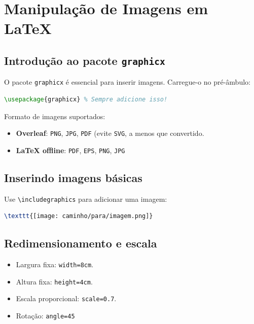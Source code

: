 \chapter{Manipulação de Imagens em LaTeX}



\section{Introdução ao pacote \texttt{graphicx}}

O pacote \verb|graphicx| é essencial para inserir imagens. Carregue-o no pré-âmbulo:

\begin{lstlisting}[language=tex, caption=Carregue o pacote \texttt{graphicx}]
    \usepackage{graphicx} % Sempre adicione isso!
\end{lstlisting}

Formato de imagens suportados:
\begin{itemize}
    \item \textbf{Overleaf}: \verb|PNG|, \verb|JPG|, \verb|PDF| (evite \verb|SVG|, a menos que convertido.
    \item \textbf{LaTeX offline}: \verb|PDF|, \verb|EPS|, \verb|PNG|, \verb|JPG|
\end{itemize}

\section{Inserindo imagens básicas}

Use \verb|\includegraphics| para adicionar uma imagem:

\begin{lstlisting}[language=tex, caption=Inserindo uma imagem]
    \texttt{[image: caminho/para/imagem.png]}  
\end{lstlisting}

\section{Redimensionamento e escala}

\begin{itemize}
    \item Largura fixa: \verb|width=8cm|.
    \item Altura fixa: \verb|height=4cm|.
    \item Escala proporcional: \verb|scale=0.7|.
    \item Rotação: \verb|angle=45|
\end{itemize}

